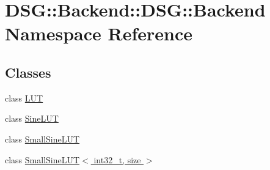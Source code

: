 \hypertarget{namespaceDSG_1_1Backend_1_1DSG_1_1Backend}{\section{D\+S\+G\+:\+:Backend\+:\+:D\+S\+G\+:\+:Backend Namespace Reference}
\label{namespaceDSG_1_1Backend_1_1DSG_1_1Backend}
}
\subsection*{Classes}
\begin{DoxyCompactItemize}
\item 
class \hyperlink{classDSG_1_1Backend_1_1DSG_1_1Backend_1_1LUT}{L\+U\+T}
\item 
class \hyperlink{classDSG_1_1Backend_1_1DSG_1_1Backend_1_1SineLUT}{Sine\+L\+U\+T}
\item 
class \hyperlink{classDSG_1_1Backend_1_1DSG_1_1Backend_1_1SmallSineLUT}{Small\+Sine\+L\+U\+T}
\item 
class \hyperlink{classDSG_1_1Backend_1_1DSG_1_1Backend_1_1SmallSineLUT_3_01int32__t_00_01size_01_4}{Small\+Sine\+L\+U\+T$<$ int32\+\_\+t, size $>$}
\end{DoxyCompactItemize}
